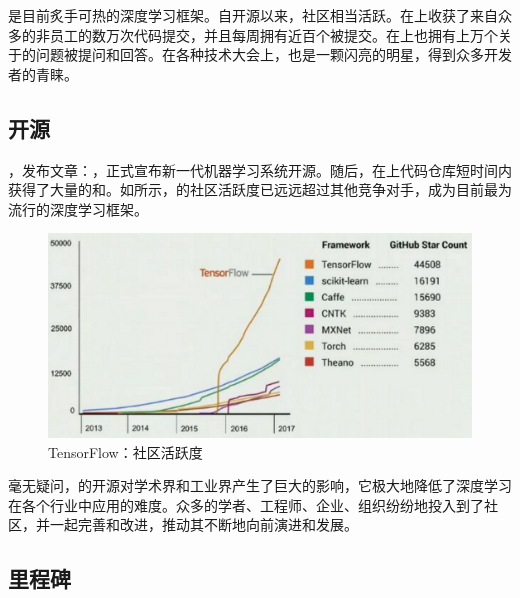 \begin{content}

\tf{}是目前炙手可热的深度学习框架。自开源以来，\tf{}社区相当活跃。在上收获了来自众多的非员工的数万次代码提交，并且每周拥有近百个被提交。在上也拥有上万个关于\tf{}的问题被提问和回答。在各种技术大会上，\tf{}也是一颗闪亮的明星，得到众多开发者的青睐。

\subsection{开源}

，发布文章：，正式宣布新一代机器学习系统开源。随后，在上代码仓库短时间内获得了大量的和。如所示，的社区活跃度已远远超过其他竞争对手，成为目前最为流行的深度学习框架。

\begin{figure}[H]
\centering
\includegraphics[width=1.0\textwidth]{figures/tf-commits.png}
\caption{TensorFlow：社区活跃度}
 \label{fig:tf-commits}
\end{figure}

毫无疑问，的开源对学术界和工业界产生了巨大的影响，它极大地降低了深度学习在各个行业中应用的难度。众多的学者、工程师、企业、组织纷纷地投入到了社区，并一起完善和改进，推动其不断地向前演进和发展。

\subsection{里程碑}


\end{content}
